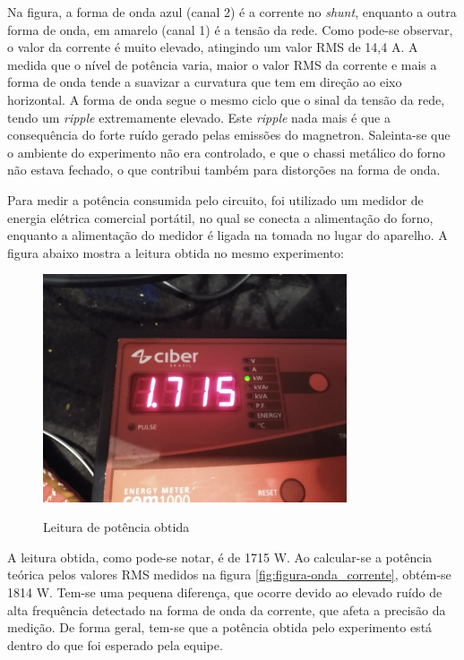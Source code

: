 Na figura, a forma de onda azul (canal 2) é a corrente no \textit{shunt}, enquanto a outra forma de onda, em amarelo (canal 1) é a tensão da rede. Como pode-se observar, o valor da corrente é muito elevado, atingindo um valor RMS de 14,4 A.  A medida que o nível de potência varia, maior o valor RMS da corrente e mais a forma de onda tende a suavizar a curvatura que tem em direção ao eixo horizontal. A forma de onda segue o mesmo ciclo que o sinal da tensão da rede, tendo um \textit{ripple} extremamente elevado. Este \textit{ripple} nada mais é que a consequência do forte ruído gerado pelas emissões do magnetron. Saleinta-se que o ambiente do experimento não era controlado, e que o chassi metálico do forno não estava fechado, o que contribui também para distorções na forma de onda.

Para medir a potência consumida pelo circuito, foi utilizado um medidor de energia elétrica comercial portátil, no qual se conecta a alimentação do forno, enquanto a alimentação do medidor é ligada na tomada no lugar do aparelho. A figura abaixo mostra a leitura obtida no mesmo experimento:

\begin{figure}[H]
    \centering
    \caption{Leitura de potência obtida}
    \includegraphics[width=0.8\textwidth]{./dados/figuras/medida_potencia_full}
    \label{fig:figura-medida_potencia_full}
\end{figure}

A leitura obtida, como pode-se notar, é de 1715 W. Ao calcular-se a potência teórica pelos valores RMS medidos na figura \ref{fig:figura-onda_corrente}, obtém-se 1814 W. Tem-se uma pequena diferença, que ocorre devido ao elevado ruído de alta frequência detectado na forma de onda da corrente, que afeta a precisão da medição. De forma geral, tem-se que a potência obtida pelo experimento está dentro do que foi esperado pela equipe.

